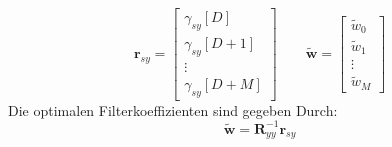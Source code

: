 \[ \textbf{r}_{sy} = \begin{bmatrix}
	\gamma_{sy}[D]\\
	\gamma_{sy}[D+1]\\
	\vdots\\
	\gamma_{sy}[D+M]
\end{bmatrix} \qquad
  \tilde{\textbf{w}} = \begin{bmatrix}
	\tilde{w}_0\\
	\tilde{w}_1\\
	\vdots\\
	\tilde{w}_M
\end{bmatrix} \]
Die optimalen Filterkoeffizienten sind gegeben Durch:
\[ \tilde{\textbf{w}} = \textbf{R}_{yy}^{-1}\textbf{r}_{sy} \]